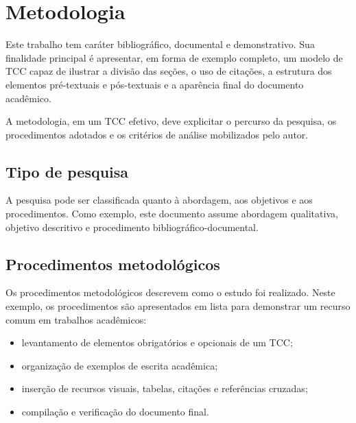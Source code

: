 %
%
%
%
%

\chapter{Metodologia}

Este trabalho tem caráter bibliográfico, documental e demonstrativo. Sua finalidade principal é apresentar, em forma de exemplo completo, um modelo de TCC capaz de ilustrar a divisão das seções, o uso de citações, a estrutura dos elementos pré-textuais e pós-textuais e a aparência final do documento acadêmico.

A metodologia, em um TCC efetivo, deve explicitar o percurso da pesquisa, os procedimentos adotados e os critérios de análise mobilizados pelo autor.

\section{Tipo de pesquisa}

A pesquisa pode ser classificada quanto à abordagem, aos objetivos e aos procedimentos. Como exemplo, este documento assume abordagem qualitativa, objetivo descritivo e procedimento bibliográfico-documental.

\section{Procedimentos metodológicos}

Os procedimentos metodológicos descrevem como o estudo foi realizado. Neste exemplo, os procedimentos são apresentados em lista para demonstrar um recurso comum em trabalhos acadêmicos:

\begin{itemize}
	\item levantamento de elementos obrigatórios e opcionais de um TCC;
	\item organização de exemplos de escrita acadêmica;
	\item inserção de recursos visuais, tabelas, citações e referências cruzadas;
	\item compilação e verificação do documento final.
\end{itemize}


